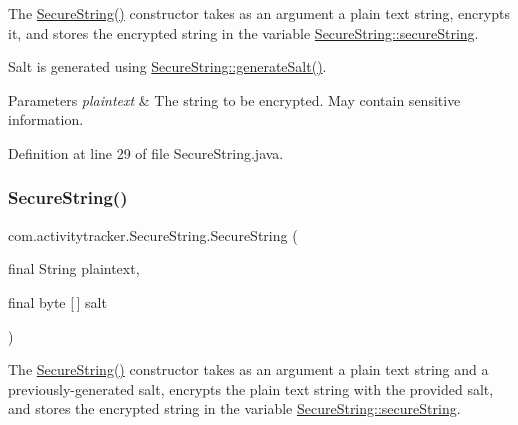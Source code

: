 The \mbox{\hyperlink{classcom_1_1activitytracker_1_1_secure_string_a889fcbf0c1f771962ac81886f49e389e}{Secure\+String()}} constructor takes as an argument a plain text string, encrypts it, and stores the encrypted string in the variable \mbox{\hyperlink{classcom_1_1activitytracker_1_1_secure_string_a1448f7b8865c6c57cc7218662ee7f1ee}{Secure\+String\+::secure\+String}}.

Salt is generated using \mbox{\hyperlink{classcom_1_1activitytracker_1_1_secure_string_a1907ad109bb5e64291fabd3ff459ef49}{Secure\+String\+::generate\+Salt()}}.


\begin{DoxyParams}{Parameters}
{\em plaintext} & The string to be encrypted. May contain sensitive information. \\
\hline
\end{DoxyParams}


Definition at line 29 of file Secure\+String.\+java.

\mbox{\label{classcom_1_1activitytracker_1_1_secure_string_a04c2f0677ecd9af147428976a11c85e2}} 
\subsubsection{\texorpdfstring{Secure\+String()}{SecureString()}\hspace{0.1cm}{\footnotesize\ttfamily [2/2]}}
{\footnotesize\ttfamily com.\+activitytracker.\+Secure\+String.\+Secure\+String (\begin{DoxyParamCaption}\item[{final String}]{plaintext,  }\item[{final byte \mbox{[}$\,$\mbox{]}}]{salt }\end{DoxyParamCaption})\hspace{0.3cm}{\ttfamily [package]}}

The \mbox{\hyperlink{classcom_1_1activitytracker_1_1_secure_string_a889fcbf0c1f771962ac81886f49e389e}{Secure\+String()}} constructor takes as an argument a plain text string and a previously-\/generated salt, encrypts the plain text string with the provided salt, and stores the encrypted string in the variable \mbox{\hyperlink{classcom_1_1activitytracker_1_1_secure_string_a1448f7b8865c6c57cc7218662ee7f1ee}{Secure\+String\+::secure\+String}}.


